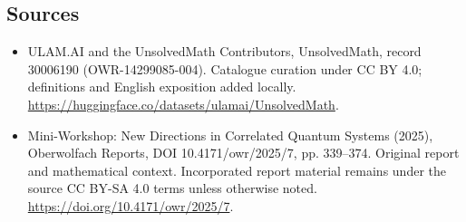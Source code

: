 \documentclass[11pt]{article}
\begin{document}
\subsection{Sources}
\begin{itemize}
\item[\hypertarget{source:30006190:1}{S1}] ULAM.AI and the UnsolvedMath Contributors, UnsolvedMath, record 30006190 (OWR-14299085-004). Catalogue curation under CC BY 4.0; definitions and English exposition added locally.
\url{https://huggingface.co/datasets/ulamai/UnsolvedMath}.
\item[\hypertarget{source:30006190:2}{S2}] Mini-Workshop: New Directions in Correlated Quantum Systems (2025), Oberwolfach Reports, DOI 10.4171/owr/2025/7, pp. 339--374. Original report and mathematical context. Incorporated report material remains under the source CC BY-SA 4.0 terms unless otherwise noted.
\url{https://doi.org/10.4171/owr/2025/7}.
\end{itemize}
\label{end:30006190}
\end{document}
